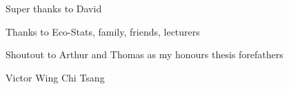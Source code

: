 
{\bigskip}Super thanks to David

{\bigskip\noindent}Thanks to Eco-Stats, family, friends, lecturers

{\bigskip\noindent}Shoutout to Arthur and Thomas as my honours thesis forefathers

{\bigskip\bigskip\bigskip\noindent}Victor Wing Chi Tsang